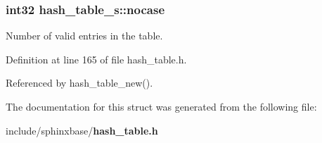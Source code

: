 \subsubsection[{nocase}]{\setlength{\rightskip}{0pt plus 5cm}int32 hash\-\_\-table\-\_\-s\-::nocase}\label{structhash__table__s_a1d1f5dbf52075c0424596ec492e2614d}


Number of valid entries in the table. 



Definition at line 165 of file hash\-\_\-table.\-h.



Referenced by hash\-\_\-table\-\_\-new().



The documentation for this struct was generated from the following file\-:\begin{DoxyCompactItemize}
\item 
include/sphinxbase/{\bf hash\-\_\-table.\-h}\end{DoxyCompactItemize}
